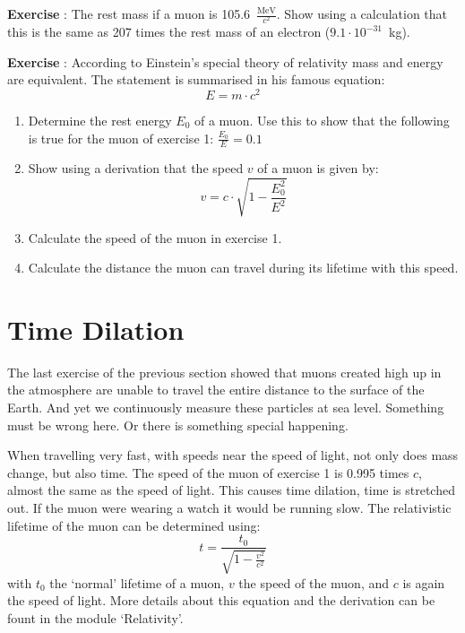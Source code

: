 \documentclass[12pt,a4paper]{article}
\numberwithin{equation}{section}
\numberwithin{figure}{section}
\newcounter{Exercise}
\numberwithin{table}{section}
\begin{document}
\begin{shaded}
\textbf{Exercise \theExercise {}} : The rest mass if a muon is 105.6~$\frac{\mbox{MeV}}{c^2}$. Show using a calculation that this is the same as 207 times the rest mass of an electron ($9.1 \cdot 10^{-31}$~kg).\end{shaded}

\begin{shaded}
\textbf{Exercise \theExercise {}} : According to Einstein's special theory of relativity mass and energy are equivalent. The statement is summarised in his famous equation:
\begin{equation}
E= m \cdot c^2
\end{equation}
\begin{enumerate}[-]
\item Determine the rest energy $E_0$ of a muon. Use this to show that the following is true for the muon of exercise 1: $\frac{E_0}{E}=0.1$
\item Show using a derivation that the speed $v$ of a muon is given by:
\begin{equation}
v = c \cdot \sqrt{1- \frac{E^2_0}{E^2}}
\end{equation}
\item Calculate the speed of the muon in exercise 1.
\item Calculate the distance the muon can travel during its lifetime with this speed.
\end{enumerate}\end{shaded}

\section{Time Dilation}
The last exercise of the previous section showed that muons created high up in the atmosphere are unable to travel the entire distance to the surface of the Earth. And yet we continuously measure these particles at sea level. Something must be wrong here. Or there is something special happening.

When travelling very fast, with speeds near the speed of light, not only does mass change, but also time. The speed of the muon of exercise 1 is 0.995 times $c$, almost the same as the speed of light. This causes time dilation, time is stretched out. If the muon were wearing a watch it would be running slow. The relativistic lifetime of the muon can be determined using:
\begin{equation}
t = \frac{t_0}{\sqrt{1 - \frac{v^2}{c^2}}}
\end{equation}
with $t_0$ the `normal' lifetime of a muon, $v$ the speed of the muon, and $c$ is again the speed of light. More details about this equation and the derivation can be fount in the module `Relativity'.
\end{document}
